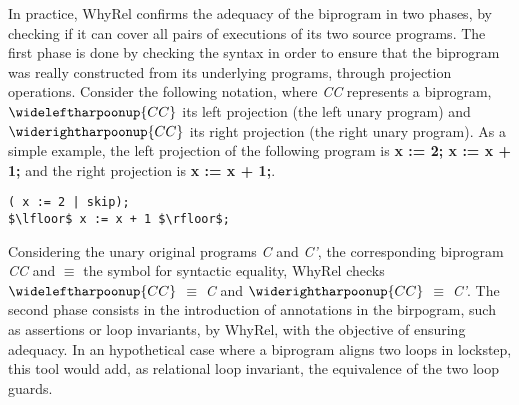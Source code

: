 In practice, WhyRel confirms the adequacy of the biprogram in two phases, by checking if it can cover all pairs of executions of its two source programs.
The first phase is done by checking the syntax in order to ensure that the biprogram was really constructed from its underlying programs, through projection operations.
Consider the following notation, where \emph{CC} represents a biprogram, $\wideleftharpoonup{CC}$ its left projection (the left unary program) and $\widerightharpoonup{CC}$ its right projection (the right unary program).
As a simple example, the left projection of the following program is \textbf{x := 2; x := x + 1;} and the right projection is \textbf{x := x + 1;}.

\begin{lstlisting}[style=while_lang, mathescape,
                      emph={skip},
                      emphstyle=\ttfamily\bfseries\color{myorange}]
( x := 2 | skip);
$\lfloor$ x := x + 1 $\rfloor$;
\end{lstlisting}

Considering the unary original programs \emph{C} and \emph{C'}, the corresponding biprogram \emph{CC} and $\equiv$ the symbol for syntactic equality, WhyRel checks $\wideleftharpoonup{CC}$ $\equiv$ \emph{C} and $\widerightharpoonup{CC}$ $\equiv$ \emph{C'}.
The second phase consists in the introduction of annotations in the birpogram, such as assertions or loop invariants, by WhyRel, with the objective of ensuring adequacy.
In an hypothetical case where a biprogram aligns two loops in lockstep, this tool would add, as relational loop invariant, the equivalence of the two loop guards.

